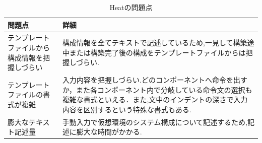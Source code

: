 \documentclass[mingoth]{kut-paper}		%
\begin{document}
	\begin{table}[H]
		\begin{center}
			\caption{Heatの問題点}
			\label{table:2}
			\begin{tabular}{|p{5cm}|p{7cm}|}\hline
				問題点 & 詳細\\ \hline \hline
				テンプレートファイルから構成情報を把握しづらい & 構成情報を全てテキストで記述しているため,一見して構築途中または構築完了後の構成をテンプレートファイルからは把握しづらい.\\ \hline
				テンプレートファイルの書式が複雑 & 入力内容を把握しづらい.どのコンポーネントへ命令を出すか，また各コンポーネント内で分岐している命令文の選択も複雑な書式といえる．また,文中のインデントの深さで入力内容を区別するという特殊な書式もある.\\ \hline
				膨大なテキスト記述量 & 手動入力で仮想環境のシステム構成について記述するため,記述に膨大な時間がかかる.\\ \hline
			\end{tabular}
		\end{center}
	\end{table}
\end{document}
